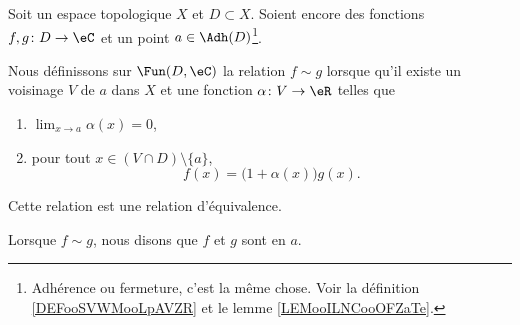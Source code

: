 \begin{propositionDef}       \label{DEFooWDSAooKXZsZY}
    Soit un espace topologique \( X\) et \( D\subset X\). Soient encore des fonctions \( f,g\colon D\to \eC\) et un point \( a\in\Adh(D)\)\footnote{Adhérence ou fermeture, c'est la même chose. Voir la définition \ref{DEFooSVWMooLpAVZR} et le lemme \ref{LEMooILNCooOFZaTe}.}.

    Nous définissons sur \( \Fun(D,\eC)\) la relation \( f\sim g\) lorsque qu'il existe un voisinage \( V\) de \( a\) dans \( X\) et une fonction \( \alpha\colon V\to \eR\) telles que
    \begin{enumerate}
        \item
            \( \lim_{x\to a} \alpha(x)=0\),
        \item
            pour tout \( x\in (V\cap D)\setminus\{ a \}\), 
            \begin{equation}        \label{EQooQXKYooSDPpNq}
                f(x)=\big( 1+\alpha(x) \big)g(x).
            \end{equation}
    \end{enumerate}
    Cette relation est une relation d'équivalence.

    Lorsque \( f\sim g\), nous disons que \( f\) et \( g\) sont  en \( a\).
\end{propositionDef}

